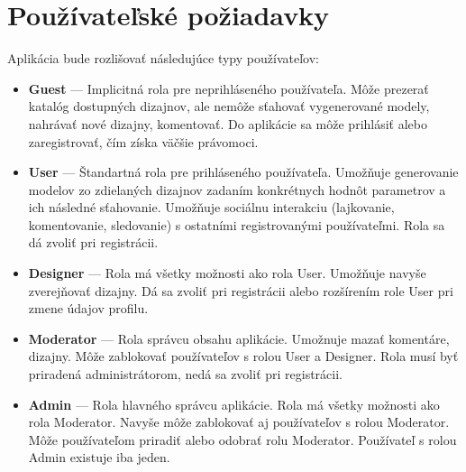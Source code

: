 \documentclass[a4paper]{article}
\begin{document}
\section{Používateľské požiadavky}

Aplikácia bude rozlišovať následujúce typy používateľov:
\begin{itemize}
    \item \textbf{Guest} ---
        Implicitná rola pre neprihláseného používateľa.
        Môže prezerať katalóg dostupných dizajnov, 
        ale nemôže sťahovať vygenerované modely, 
        nahrávať nové dizajny, komentovať.
        Do aplikácie sa môže prihlásiť alebo zaregistrovať,
        čím získa väčšie právomoci.
    \item \textbf{User} ---
        Štandartná rola pre prihláseného používateľa.
        Umožňuje generovanie modelov zo zdielaných dizajnov 
        zadaním konkrétnych hodnôt parametrov a ich následné sťahovanie.
        Umožňuje sociálnu interakciu (lajkovanie, komentovanie, sledovanie) 
        s ostatními registrovanými používateľmi.
        Rola sa dá zvoliť pri registrácii.
    \item \textbf{Designer} ---
        Rola má všetky možnosti ako rola User.
        Umožňuje navyše zverejňovať dizajny.
        Dá sa zvoliť pri registrácii alebo rozšírením role User
        pri zmene údajov profilu.
    \item \textbf{Moderator} ---
        Rola správcu obsahu aplikácie.
        Umožnuje mazať komentáre, dizajny.
        Môže zablokovať používateľov s rolou User a Designer.
        Rola musí byť priradená administrátorom, nedá sa zvoliť pri registrácii.
    \item \textbf{Admin} ---
        Rola hlavného správcu aplikácie.
        Rola má všetky možnosti ako rola Moderator.
        Navyše môže zablokovať aj používateľov s rolou Moderator.
        Môže používateľom priradiť alebo odobrať rolu Moderator.
        Používateľ s rolou Admin existuje iba jeden.
\end{itemize}
\end{document}
